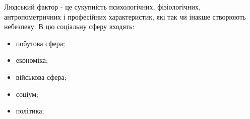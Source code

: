 Людський фактор - це сукупність психологічних, фізіологічних, антропометричних і професійних характеристик, які так чи інакше створюють небезпеку.
В цю соціальну сферу входять:
\begin{itemize}
\item побутова сфера;
\item економіка;
\item військова сфера;
\item соціум;
\item політика;
\end{itemize}